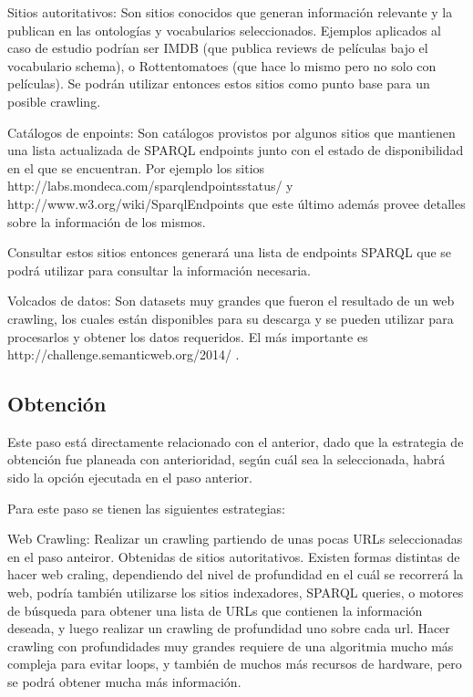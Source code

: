 Sitios autoritativos: Son sitios conocidos que generan información relevante y la publican en las ontologías y vocabularios 
seleccionados. Ejemplos aplicados al caso de estudio podrían ser IMDB (que publica reviews de películas bajo el vocabulario schema), o Rottentomatoes
(que hace lo mismo pero no solo con películas). Se podrán utilizar entonces estos sitios como punto base para un posible crawling.

Catálogos de enpoints: Son catálogos provistos por algunos sitios que mantienen una lista actualizada de SPARQL endpoints 
junto con el estado de disponibilidad en el que se encuentran. Por ejemplo los sitios http://labs.mondeca.com/sparqlendpointsstatus/ y 
http://www.w3.org/wiki/SparqlEndpoints que este último además provee detalles sobre la información de los mismos.

Consultar estos sitios entonces generará una lista de endpoints SPARQL que se podrá utilizar para consultar la información necesaria.

Volcados de datos: Son datasets muy grandes que fueron el resultado de un web crawling, los cuales están disponibles para su descarga 
y se pueden utilizar para procesarlos y obtener los datos requeridos. El más importante es http://challenge.semanticweb.org/2014/ .

\subsection{Obtención}

Este paso está directamente relacionado con el anterior, dado que la estrategia de obtención fue planeada con anterioridad, según 
cuál sea la seleccionada, habrá sido la opción ejecutada en el paso anterior.

Para este paso se tienen las siguientes estrategias:

Web Crawling: Realizar un crawling partiendo de unas pocas URLs seleccionadas en el paso anteiror. Obtenidas de sitios autoritativos.
Existen formas distintas de hacer web craling, dependiendo del nivel de profundidad en el cuál se recorrerá la web, podría también utilizarse los 
sitios indexadores, SPARQL queries, o motores de búsqueda para obtener una lista de URLs que contienen la información deseada, y luego realizar un crawling de profundidad uno sobre cada url.
Hacer crawling con profundidades muy grandes requiere de una algoritmia mucho más compleja para evitar loops, y también de muchos más recursos de hardware, pero se podrá obtener mucha más información.

